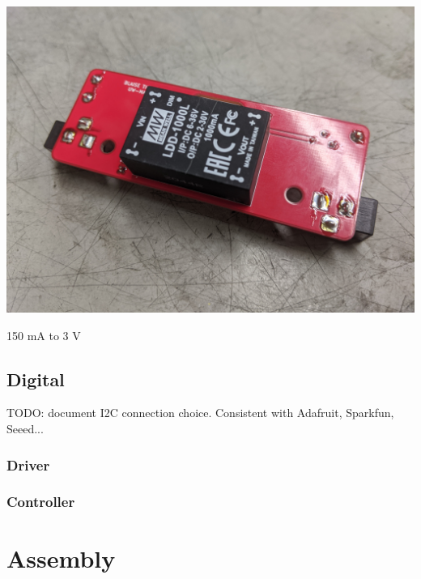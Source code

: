 \documentclass[11pt]{article}
\let\stdsection\section
\renewcommand\section{\clearpage\stdsection}
\begin{document}
\begin{center}
  \includegraphics[width=\textwidth/2]{"./pcb-driver.jpg"}
\end{center}

150 mA to 3 V



\subsection{Digital}

TODO: document I2C connection choice.
Consistent with Adafruit, Sparkfun, Seeed...

\subsubsection{Driver}



\subsubsection{Controller}

\section{Assembly}
\end{document}
